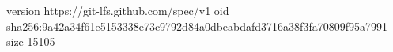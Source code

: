 version https://git-lfs.github.com/spec/v1
oid sha256:9a42a34f61e5153338e73c9792d84a0dbeabdafd3716a38f3fa70809f95a7991
size 15105
